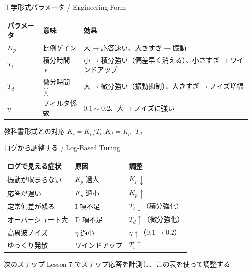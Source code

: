 \documentclass[aspectratio=169, 14pt]{beamer}
\begin{document}
\begin{frame}{工学形式パラメータ / Engineering Form}
  \begin{table}
    \centering
    \footnotesize
    \begin{tabular}{llp{55mm}}
      \hline
      \textbf{パラメータ} & \textbf{意味} & \textbf{効果} \\
      \hline
      $K_p$  & 比例ゲイン   & 大$\to$応答速い、大きすぎ$\to$振動 \\
      $T_i$  & 積分時間 [s] & 小$\to$積分強い（偏差早く消える）、小さすぎ$\to$ワインドアップ \\
      $T_d$  & 微分時間 [s] & 大$\to$微分強い（振動抑制）、大きすぎ$\to$ノイズ増幅 \\
      $\eta$ & フィルタ係数  & $0.1 \sim 0.2$、大$\to$ノイズに強い \\
      \hline
    \end{tabular}
  \end{table}

  \vspace{0.5em}

  \begin{block}{教科書形式との対応}
    $K_i = K_p / T_i$\,,\quad $K_d = K_p \cdot T_d$
  \end{block}
\end{frame}

\begin{frame}{ログから調整する / Log-Based Tuning}
  \begin{table}
    \centering
    \footnotesize
    \begin{tabular}{lll}
      \hline
      \textbf{ログで見える症状} & \textbf{原因} & \textbf{調整} \\
      \hline
      振動が収まらない   & $K_p$ 過大          & $K_p\!\downarrow$ \\
      応答が遅い         & $K_p$ 過小          & $K_p\!\uparrow$ \\
      定常偏差が残る     & I 項不足            & $T_i\!\downarrow$（積分強化）\\
      オーバーシュート大 & D 項不足            & $T_d\!\uparrow$（微分強化）\\
      高周波ノイズ       & $\eta$ 過小         & $\eta\!\uparrow$（$0.1\!\to\!0.2$）\\
      ゆっくり発散       & ワインドアップ      & $T_i\!\uparrow$ \\
      \hline
    \end{tabular}
  \end{table}

  \vspace{0.5em}

  \begin{block}{次のステップ}
    Lesson 7 でステップ応答を計測し、この表を使って調整する
  \end{block}
\end{frame}
\end{document}
